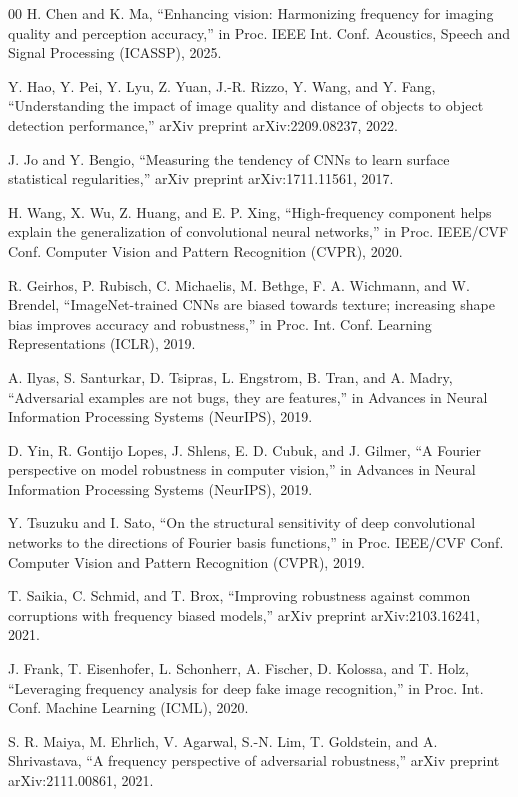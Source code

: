 \documentclass[conference]{IEEEtran}
\begin{document}
\begin{thebibliography}{00}
 H. Chen and K. Ma, ``Enhancing vision: Harmonizing frequency for
imaging quality and perception accuracy,'' in Proc. IEEE Int. Conf. Acoustics,
Speech and Signal Processing (ICASSP), 2025.

 Y. Hao, Y. Pei, Y. Lyu, Z. Yuan, J.-R. Rizzo, Y. Wang, and Y.
Fang, ``Understanding the impact of image quality and distance of objects to
object detection performance,'' arXiv preprint arXiv:2209.08237, 2022.

 J. Jo and Y. Bengio, ``Measuring the tendency of CNNs to learn
surface statistical regularities,'' arXiv preprint arXiv:1711.11561, 2017.

 H. Wang, X. Wu, Z. Huang, and E. P. Xing, ``High-frequency
component helps explain the generalization of convolutional neural networks,''
in Proc. IEEE/CVF Conf. Computer Vision and Pattern Recognition (CVPR), 2020.

 R. Geirhos, P. Rubisch, C. Michaelis, M. Bethge, F. A. Wichmann,
and W. Brendel, ``ImageNet-trained CNNs are biased towards texture; increasing
shape bias improves accuracy and robustness,'' in Proc. Int. Conf. Learning
Representations (ICLR), 2019.

 A. Ilyas, S. Santurkar, D. Tsipras, L. Engstrom, B. Tran, and A.
Madry, ``Adversarial examples are not bugs, they are features,'' in Advances in
Neural Information Processing Systems (NeurIPS), 2019.

 D. Yin, R. Gontijo Lopes, J. Shlens, E. D. Cubuk, and J. Gilmer,
``A Fourier perspective on model robustness in computer vision,'' in Advances
in Neural Information Processing Systems (NeurIPS), 2019.

 Y. Tsuzuku and I. Sato, ``On the structural sensitivity of deep
convolutional networks to the directions of Fourier basis functions,'' in Proc.
IEEE/CVF Conf. Computer Vision and Pattern Recognition (CVPR), 2019.

 T. Saikia, C. Schmid, and T. Brox, ``Improving robustness against
common corruptions with frequency biased models,'' arXiv preprint
arXiv:2103.16241, 2021.

 J. Frank, T. Eisenhofer, L. Schonherr, A. Fischer, D. Kolossa,
and T. Holz, ``Leveraging frequency analysis for deep fake image recognition,''
in Proc. Int. Conf. Machine Learning (ICML), 2020.

 S. R. Maiya, M. Ehrlich, V. Agarwal, S.-N. Lim, T. Goldstein, and
A. Shrivastava, ``A frequency perspective of adversarial robustness,'' arXiv
preprint arXiv:2111.00861, 2021.


\end{thebibliography}
\end{document}
